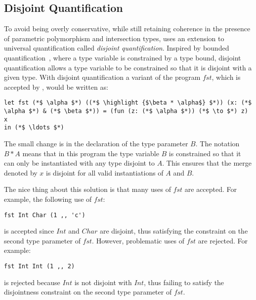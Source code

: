 \subsection{Disjoint Quantification}
To avoid being overly conservative, while still retaining coherence in the
presence of parametric polymorphism and intersection types, \name uses
an extension to universal quantification called \emph{disjoint quantification}.
Inspired by
bounded quantification~\cite{Cardelli:1994},
where a type variable is constrained by a type
bound, disjoint quantification allows a type variable to be
constrained so that it is disjoint with a
given type. With disjoint quantification a variant of the program $fst$, which
is accepted by \name, would be written as:
\begin{lstlisting}
let fst (*$ \alpha $*) ((*$ \highlight {$\beta * \alpha$} $*)) (x: (*$ \alpha $*) & (*$ \beta $*)) = (fun (z: (*$ \alpha $*)) (*$ \to $*) z) x
in (*$ \ldots $*)
\end{lstlisting}
The small change is in the declaration of the type parameter $B$. The notation
$B*A$ means that in this program the type variable $B$ is constrained so that
it can only be instantiated with any type disjoint to $A$.
This ensures that the
merge denoted by $x$ is disjoint for all valid instantiations of $A$ and $B$.

The nice thing about this solution is that many uses of $fst$ are accepted.
For example, the following use of $fst$:
\begin{lstlisting}
fst Int Char (1 ,, 'c')
\end{lstlisting}
is accepted since $Int$ and $Char$ are disjoint, thus satisfying the constraint
on the second type parameter of $fst$.
However, problematic uses of $fst$ are rejected. For example:
\begin{lstlisting}
fst Int Int (1 ,, 2)
\end{lstlisting}
is rejected because $Int$ is not disjoint with $Int$, thus failing to satisfy the
disjointness constraint on the second type parameter of $fst$.

\begin{comment}
Note that there is a nice symmetry between bounded quantification and disjoint quantification.
In systems with bounded quantification,
the usual unconstrained quantifier $\for {\alpha} \ldots$
is a syntactic sugar for $\for {\alpha \subtype \top} \ldots$, and
$\blam \alpha \ldots$ for $\blam {\alpha \subtype \top} \ldots$.
In parellel, in our system with disjoint quantification,
the usual unconstrained quantifier $\for {\alpha} \ldots$
is a syntactic sugar for $\for {\alpha \disjoint \bot} \ldots$, and
$\blam \alpha \ldots$ for $\blam {\alpha \disjoint \top} \ldots$.
The intuition is that since the bottom type is akin to the empty set,
no other type overlaps with it.\george{Format this paragraph better.}
\end{comment}


